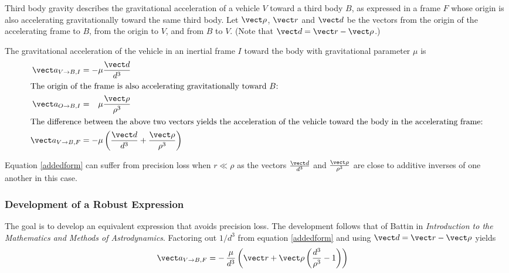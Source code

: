 Third body gravity describes the gravitational acceleration of a vehicle $V$
toward a third body $B$, as expressed in a frame $F$ whose origin is also
accelerating gravitationally toward the same third body.
Let $\vect \rho$, $\vect r$ and $\vect d$ be the vectors from the origin
of the accelerating frame to $B$, from the origin to $V$, and from $B$ to $V$.
(Note that $\vect d = \vect r - \vect \rho$.)

The gravitational acceleration of the vehicle in an inertial frame $I$ toward
the body with gravitational parameter $\mu$ is
\begin{align}
\vect a_{V\to B,I} &= - \mu \frac {\vect d}{d^3} \\
\intertext{The origin of the frame is also accelerating gravitationally toward
$B$:}
\vect a_{O\to B,I} &= \phantom{-} \mu \frac {\vect \rho}{\rho^3} \\
\intertext{The difference between the above two vectors yields the acceleration
of the vehicle toward the body in the accelerating frame:}
\vect a_{V\to B,F}
  &= - \mu \left( \frac {\vect d} {d^3} + \frac {\vect \rho} {\rho^3} \right)
  \label{addedform}
\end{align}

Equation \eqref{addedform} can suffer from precision loss when $r \ll \rho$
as the vectors $\frac{\vect d}{d^3}$ and $\frac{\vect \rho}{\rho^3}$
are close to additive inverses of one another in this case. 

\subsubsection{Development of a Robust Expression}
The goal is to develop an equivalent expression that avoids precision loss.
The development follows that of Battin in
\emph{Introduction to the Mathematics and Methods of Astrodynamics}.
Factoring out $1/d^3$ from equation \eqref{addedform}
and using $\vect d = \vect r - \vect \rho$ yields
\begin{align}
\vect a_{V\to B,F}
  &= -\,\frac {\mu}{d^3}
     \left(  \vect r
           + \vect \rho \left(\frac {d^3}{\rho^3} - 1\right) \right)
  \label{scalarform}
\end{align}

